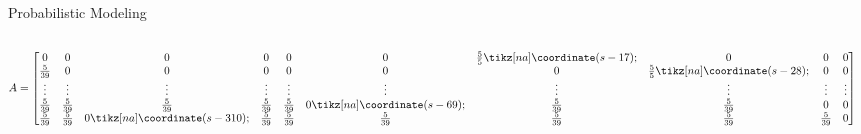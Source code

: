 
\begin{frame}{Probabilistic Modeling}



\begin{columns}
    \begin{column}{0.48\textwidth}
        \centering
        \tiny
        
        \tiny
        \begin{align*}
        A &= \begin{bmatrix}
        0 & 0 & 0 & 0 & 0 & 0 & \frac{5}{5} \tikz[na] \coordinate (s-17); & 0 & 0 & 0 \\ 
        \frac{5}{39} & 0 & 0 & 0 & 0 & 0 & 0 & \frac{5}{5} \tikz[na] \coordinate (s-28); & 0 & 0  \\ 
        \vdots & \vdots & \vdots & \vdots & \vdots & \vdots & \vdots & \vdots & \vdots & \vdots \\
        \frac{5}{39} & \frac{5}{39} & \frac{5}{39} & \frac{5}{39} & \frac{5}{39} & 0 \tikz[na] \coordinate (s-69); & \frac{5}{39} & \frac{5}{39} & 0 &  0 \\ 
        \frac{5}{39} & \frac{5}{39} & 0 \tikz[na] \coordinate (s-310); & \frac{5}{39} & \frac{5}{39} & \frac{5}{39} & \frac{5}{39} & \frac{5}{39} & \frac{5}{39} & 0 \\ 
        \end{bmatrix}
        \end{align*}
        

\end{column}
\end{columns}
\end{frame}
